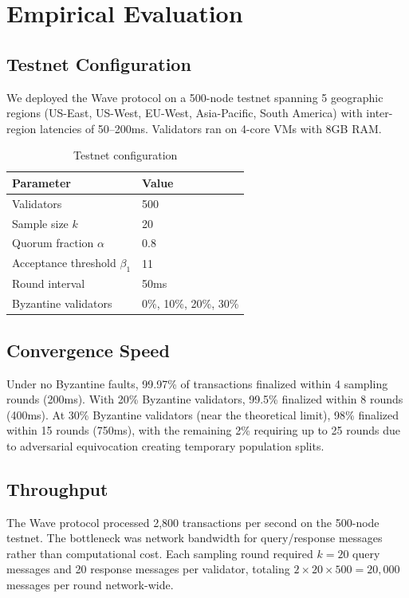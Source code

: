 \section{Empirical Evaluation}

\label{sec:wave-evaluation}

\subsection{Testnet Configuration}

We deployed the Wave protocol on a 500-node testnet spanning 5 geographic regions
(US-East, US-West, EU-West, Asia-Pacific, South America) with inter-region latencies
of 50--200ms. Validators ran on 4-core VMs with 8GB RAM.

\begin{table}[h]
\centering
\begin{tabular}{@{}ll@{}}
\toprule
\textbf{Parameter} & \textbf{Value} \\
\midrule
Validators & 500 \\
Sample size $k$ & 20 \\
Quorum fraction $\alpha$ & 0.8 \\
Acceptance threshold $\beta_1$ & 11 \\
Round interval & 50ms \\
Byzantine validators & 0\%, 10\%, 20\%, 30\% \\
\bottomrule
\end{tabular}
\caption{Testnet configuration}
\label{tab:wave-testnet}
\end{table}

\subsection{Convergence Speed}

Under no Byzantine faults, 99.97\% of transactions finalized within 4 sampling rounds
(200ms). With 20\% Byzantine validators, 99.5\% finalized within 8 rounds (400ms).
At 30\% Byzantine validators (near the theoretical limit), 98\% finalized within 15
rounds (750ms), with the remaining 2\% requiring up to 25 rounds due to adversarial
equivocation creating temporary population splits.

\subsection{Throughput}

The Wave protocol processed 2,800 transactions per second on the 500-node testnet.
The bottleneck was network bandwidth for query/response messages rather than computational
cost. Each sampling round required $k = 20$ query messages and 20 response messages per
validator, totaling $2 \times 20 \times 500 = 20{,}000$ messages per round network-wide.


